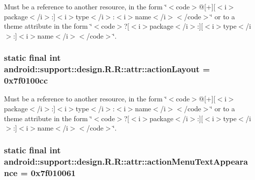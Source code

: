 Must be a reference to another resource, in the form \char`\"{}$<$code$>$@\mbox{[}+\mbox{]}\mbox{[}$<$i$>$package$<$/i$>$:\mbox{]}$<$i$>$type$<$/i$>$:$<$i$>$name$<$/i$>$$<$/code$>$\char`\"{} or to a theme attribute in the form \char`\"{}$<$code$>$?\mbox{[}$<$i$>$package$<$/i$>$:\mbox{]}\mbox{[}$<$i$>$type$<$/i$>$:\mbox{]}$<$i$>$name$<$/i$>$$<$/code$>$\char`\"{}. \hypertarget{classandroid_1_1support_1_1design_1_1_r_1_1attr_c68bf11986e32de15a449b640e239c30}{
\subsubsection[{actionLayout}]{\setlength{\rightskip}{0pt plus 5cm}static final int android::support::design.R.R::attr::actionLayout = 0x7f0100cc}}
\label{classandroid_1_1support_1_1design_1_1_r_1_1attr_c68bf11986e32de15a449b640e239c30}


Must be a reference to another resource, in the form \char`\"{}$<$code$>$@\mbox{[}+\mbox{]}\mbox{[}$<$i$>$package$<$/i$>$:\mbox{]}$<$i$>$type$<$/i$>$:$<$i$>$name$<$/i$>$$<$/code$>$\char`\"{} or to a theme attribute in the form \char`\"{}$<$code$>$?\mbox{[}$<$i$>$package$<$/i$>$:\mbox{]}\mbox{[}$<$i$>$type$<$/i$>$:\mbox{]}$<$i$>$name$<$/i$>$$<$/code$>$\char`\"{}. \hypertarget{classandroid_1_1support_1_1design_1_1_r_1_1attr_338ca23370c6c64236b630be74802796}{
\subsubsection[{actionMenuTextAppearance}]{\setlength{\rightskip}{0pt plus 5cm}static final int android::support::design.R.R::attr::actionMenuTextAppearance = 0x7f010061}}
\label{classandroid_1_1support_1_1design_1_1_r_1_1attr_338ca23370c6c64236b630be74802796}


